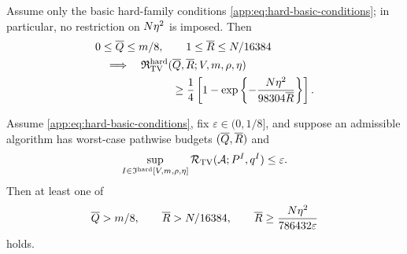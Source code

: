 \begin{theorem}
\label{app:thm:nonlinear-finite-lower}
Assume only the basic hard-family conditions
\eqref{app:eq:hard-basic-conditions}; in particular, no restriction on
\(N\eta^2\) is imposed. Then
\begin{equation}
 \begin{aligned}
 &0\le \overline Q{}\le m/8,
 \qquad
 1\le \overline R{}\le N/16384\\
 &\quad\Longrightarrow\quad
 \mathfrak R_{\mathrm{TV}}^{\mathrm{hard}}(\overline Q{},\overline R{};V,m,
              \rho,\eta)\\
 &\hspace{7em}\ge
 \frac14\left[
  1-\exp\left\{-\frac{N\eta^2}{98304\overline R{}}\right\}
 \right].
 \end{aligned}
 \label{app:eq:nonlinear-finite-lower}
\end{equation}
\end{theorem}

\begin{corollary}
\label{app:cor:nonlinear-finite-target-tradeoff}
Assume \eqref{app:eq:hard-basic-conditions}, fix
\(\varepsilon\in(0,1/8]\), and suppose an admissible algorithm has
worst-case pathwise budgets $(\overline Q{},\overline R{})$ and
\begin{equation}
 \sup_{I\in\mathfrak I^{\mathrm{hard}}[V,m,
                         \rho,\eta]}
 \mathcal R_{\mathrm{TV}}(\mathcal A;P^{I},q^{I})\le\varepsilon.
 \label{app:eq:finite-target-risk}
\end{equation}
Then at least one of
\begin{equation}
 \overline Q{}>m/8,
 \qquad
 \overline R{}>N/16384,
 \qquad
 \overline R{}\ge\frac{N\eta^2}{786432\varepsilon}
 \label{app:eq:nonlinear-finite-target-alternative}
\end{equation}
holds.
\end{corollary}


